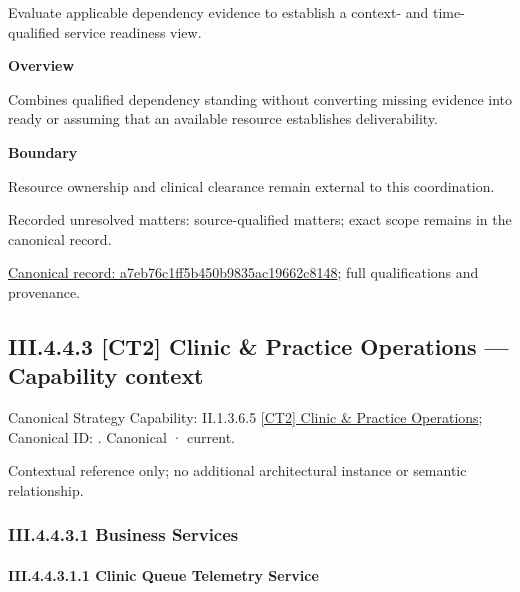 Evaluate applicable dependency evidence to establish a context- and time-qualified service readiness view.



\textbf{Overview}



Combines qualified dependency standing without converting missing evidence into ready or assuming that an available resource establishes deliverability.



\textbf{Boundary}



Resource ownership and clinical clearance remain external to this coordination.


{\small Recorded unresolved matters: source-qualified matters; exact scope remains in the canonical record.}\par
{\footnotesize \href{../../../../continuum/business/business-function/a7eb76c1ff5b450b9835ac19662c8148.md}{Canonical record: a7eb76c1ff5b450b9835ac19662c8148}; full qualifications and provenance.}\par
\subsection*{III.4.4.3 [CT2] Clinic \& Practice Operations — Capability context}
\label{navigation:III.4.4.3}

{\small Canonical Strategy Capability: II.1.3.6.5 \hyperref[element:3dffe63e03124efab255204ee4e9a5d9]{[CT2] Clinic \& Practice Operations}; Canonical ID: \texttt{}. Canonical · current.}\par
Contextual reference only; no additional architectural instance or semantic relationship.\par
\subsubsection*{III.4.4.3.1 Business Services}
\label{navigation:III.4.4.3.1}

\paragraph*{III.4.4.3.1.1 Clinic Queue Telemetry Service}
\label{navigation:III.4.4.3.1.1}


